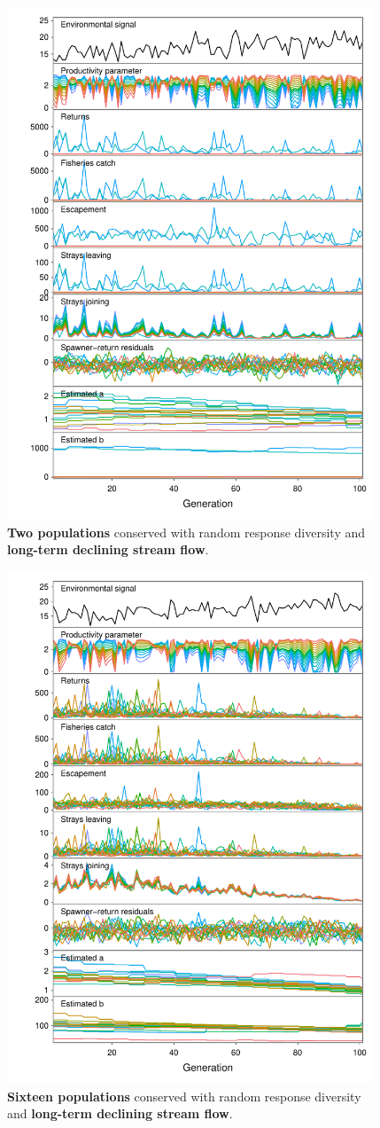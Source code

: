 \begin{figure}[htbp]
\centering
\includegraphics[width=4.3in]{metafolio/n-linear-arma-sim-2-squeeze}
\caption{\textbf{Two populations} conserved with random response diversity
and \textbf{long-term declining stream flow}.}
\label{f:eg-n-squeeze-two}
\end{figure}

\clearpage

\begin{figure}[htbp]
\centering
\includegraphics[width=4.3in]{metafolio/n-linear-arma-sim-16-squeeze}
\caption{\textbf{Sixteen populations} conserved with random response diversity
and \textbf{long-term declining stream flow}.}
\label{f:eg-n-squeeze-twelve}
\end{figure}
